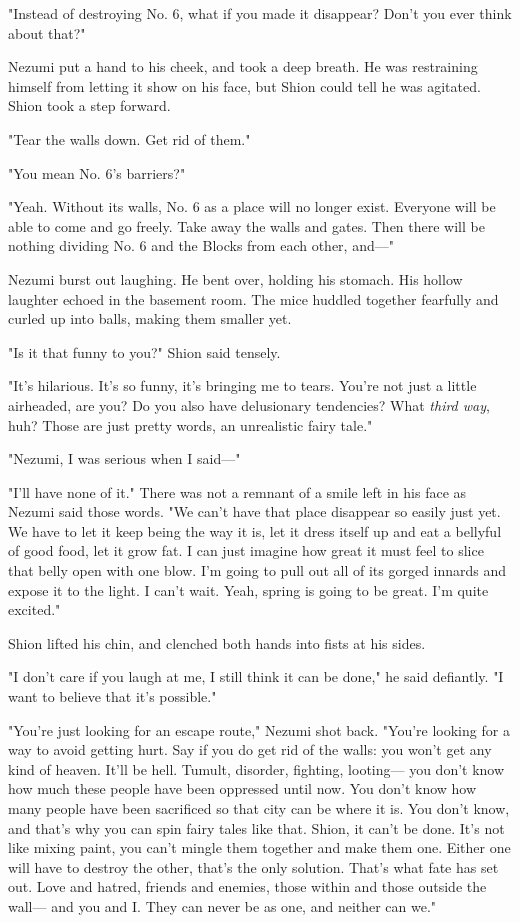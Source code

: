 "Instead of destroying No. 6, what if you made it disappear? Don't you
ever think about that?"

Nezumi put a hand to his cheek, and took a deep breath. He was
restraining himself from letting it show on his face, but Shion could
tell he was agitated. Shion took a step forward.

"Tear the walls down. Get rid of them."

"You mean No. 6's barriers?"

"Yeah. Without its walls, No. 6 as a place will no longer exist.
Everyone will be able to come and go freely. Take away the walls and
gates. Then there will be nothing dividing No. 6 and the Blocks from
each other, and---"

Nezumi burst out laughing. He bent over, holding his stomach. His hollow
laughter echoed in the basement room. The mice huddled together
fearfully and curled up into balls, making them smaller yet.

"Is it that funny to you?" Shion said tensely.

"It's hilarious. It's so funny, it's bringing me to tears. You're not
just a little airheaded, are you? Do you also have delusionary
tendencies? What \emph{third way}, huh? Those are just pretty words, an
unrealistic fairy tale."

"Nezumi, I was serious when I said---"

"I'll have none of it." There was not a remnant of a smile left in his
face as Nezumi said those words. "We can't have that place disappear so
easily just yet. We have to let it keep being the way it is, let it
dress itself up and eat a bellyful of good food, let it grow fat. I can
just imagine how great it must feel to slice that belly open with one
blow. I'm going to pull out all of its gorged innards and expose it to
the light. I can't wait. Yeah, spring is going to be great. I'm quite
excited."

Shion lifted his chin, and clenched both hands into fists at his sides.

"I don't care if you laugh at me, I still think it can be done," he said
defiantly. "I want to believe that it's possible."

"You're just looking for an escape route," Nezumi shot back. "You're
looking for a way to avoid getting hurt. Say if you do get rid of the
walls: you won't get any kind of heaven. It'll be hell. Tumult,
disorder, fighting, looting--- you don't know how much these people have
been oppressed until now. You don't know how many people have been
sacrificed so that city can be where it is. You don't know, and that's
why you can spin fairy tales like that. Shion, it can't be done. It's
not like mixing paint, you can't mingle them together and make them one.
Either one will have to destroy the other, that's the only solution.
That's what fate has set out. Love and hatred, friends and enemies,
those within and those outside the wall--- and you and I. They can never
be as one, and neither can we."

